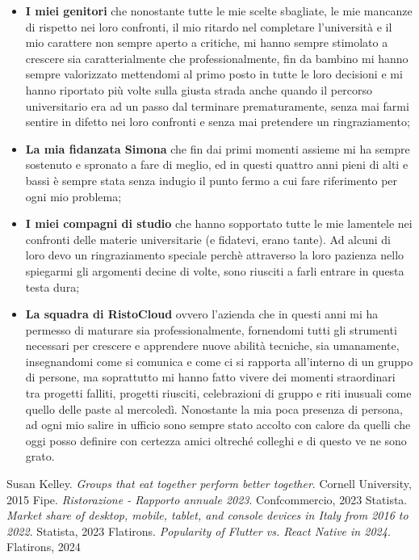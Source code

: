 \documentclass[a4paper, titlepage, 12pt, openright, twoside]{book}
\begin{document}
\begin{itemize}
	\item \textbf{I miei genitori} che nonostante tutte le mie scelte sbagliate, le mie mancanze di rispetto nei loro confronti, il mio ritardo nel completare l'università e il mio carattere non sempre aperto a critiche, mi hanno sempre stimolato a crescere sia caratterialmente che professionalmente, fin da bambino mi hanno sempre valorizzato mettendomi al primo posto in tutte le loro decisioni e mi hanno riportato più volte sulla giusta strada anche quando il percorso universitario era ad un passo dal terminare prematuramente, senza mai farmi sentire in difetto nei loro confronti e senza mai pretendere un ringraziamento;
	\item \textbf{La mia fidanzata Simona} che fin dai primi momenti assieme mi ha sempre sostenuto e spronato a fare di meglio, ed in questi quattro anni pieni di alti e bassi è sempre stata senza indugio il punto fermo a cui fare riferimento per ogni mio problema;
	\item \textbf{I miei compagni di studio} che hanno sopportato tutte le mie lamentele nei confronti delle materie universitarie (e fidatevi, erano tante). Ad alcuni di loro devo un ringraziamento speciale perchè attraverso la loro pazienza nello spiegarmi gli argomenti decine di volte, sono riusciti a farli entrare in questa testa dura;
	\item \textbf{La squadra di RistoCloud} ovvero l'azienda che in questi anni mi ha permesso di maturare sia professionalmente, fornendomi tutti gli strumenti necessari per crescere e apprendere nuove abilità tecniche, sia umanamente, insegnandomi come si comunica e come ci si rapporta all'interno di un gruppo di persone, ma soprattutto mi hanno fatto vivere dei momenti straordinari tra progetti falliti, progetti riusciti, celebrazioni di gruppo e riti inusuali come quello delle paste al mercoledì. Nonostante la mia poca presenza di persona, ad ogni mio salire in ufficio sono sempre stato accolto con calore da quelli che oggi posso definire con certezza amici oltreché colleghi e di questo ve ne sono grato.
\end{itemize}

\begin{thebibliography}{4}
	 Susan Kelley. \textsl{Groups that eat together perform better together}. Cornell University, 2015
	 Fipe. \textsl{Ristorazione - Rapporto annuale 2023}. Confcommercio, 2023
	 Statista. \textsl{Market share of desktop, mobile, tablet, and console devices in Italy from 2016 to 2022}. Statista, 2023
	 Flatirons. \textsl{Popularity of Flutter vs. React Native in 2024}. Flatirons, 2024
\end{thebibliography}
\end{document}
